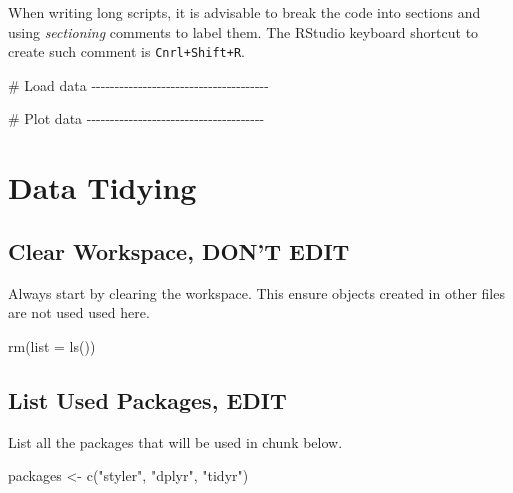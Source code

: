 \documentclass[
  letterpaper,
  DIV=11,
  numbers=noendperiod]{scrreprt}
\newenvironment{Shaded}{\begin{snugshade}}{\end{snugshade}}
\newcommand{\AttributeTok}[1]{\textcolor[rgb]{0.40,0.45,0.13}{#1}}
\newcommand{\CommentTok}[1]{\textcolor[rgb]{0.37,0.37,0.37}{#1}}
\newcommand{\FunctionTok}[1]{\textcolor[rgb]{0.28,0.35,0.67}{#1}}
\newcommand{\NormalTok}[1]{\textcolor[rgb]{0.00,0.23,0.31}{#1}}
\newcommand{\OtherTok}[1]{\textcolor[rgb]{0.00,0.23,0.31}{#1}}
\newcommand{\StringTok}[1]{\textcolor[rgb]{0.13,0.47,0.30}{#1}}
\begin{document}
When writing long scripts, it is advisable to break the code into
sections and using \emph{sectioning} comments to label them. The RStudio
keyboard shortcut to create such comment is \texttt{Cnrl+Shift+R}.

\begin{Shaded}
\begin{Highlighting}[]
\CommentTok{\# Load data {-}{-}{-}{-}{-}{-}{-}{-}{-}{-}{-}{-}{-}{-}{-}{-}{-}{-}{-}{-}{-}{-}{-}{-}{-}{-}{-}{-}{-}{-}{-}{-}{-}{-}{-}{-}{-}{-}}

\CommentTok{\# Plot data {-}{-}{-}{-}{-}{-}{-}{-}{-}{-}{-}{-}{-}{-}{-}{-}{-}{-}{-}{-}{-}{-}{-}{-}{-}{-}{-}{-}{-}{-}{-}{-}{-}{-}{-}{-}{-}{-}}
\end{Highlighting}
\end{Shaded}

\chapter{Data Tidying}\label{data-tidying}

\section*{Clear Workspace, DON'T
EDIT}\label{clear-workspace-dont-edit-6}


Always start by clearing the workspace. This ensure objects created in
other files are not used used here.

\begin{Shaded}
\begin{Highlighting}[]
\FunctionTok{rm}\NormalTok{(}\AttributeTok{list =} \FunctionTok{ls}\NormalTok{())}
\end{Highlighting}
\end{Shaded}

\section*{List Used Packages, EDIT}\label{list-used-packages-edit-6}


List all the packages that will be used in chunk below.

\begin{Shaded}
\begin{Highlighting}[]
\NormalTok{packages }\OtherTok{\textless{}{-}} \FunctionTok{c}\NormalTok{(}\StringTok{"styler"}\NormalTok{, }\StringTok{"dplyr"}\NormalTok{, }\StringTok{"tidyr"}\NormalTok{)}
\end{Highlighting}
\end{Shaded}
\end{document}
